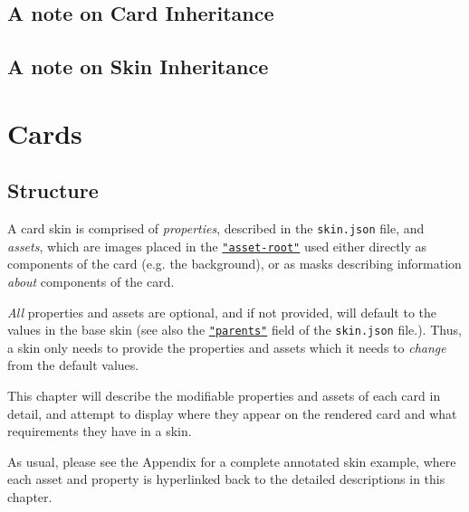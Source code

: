 \documentclass[a4paper, 10pt]{report}
\begin{document}
\section{A note on Card Inheritance}
\section{A note on Skin Inheritance}
\chapter{Cards}\label{chapter:cards}
\section{Structure}
A card skin is comprised of \emph{properties}, described in the \texttt{skin.json} file,
and \emph{assets}, which are images placed in the \hyperlink{skin-asset-root}{\texttt{"asset-root"}}
used either directly as components of the card (e.g. the background),
or as masks describing information \emph{about} components of the card.

\emph{All} properties and assets are optional, and if not provided, will default to the values in the base skin
(see also the \hyperlink{skin-parents}{\texttt{"parents"}} field of the \texttt{skin.json} file.).
Thus, a skin only needs to provide the properties and assets which it needs to \emph{change} from the default values.

This chapter will describe the modifiable properties and assets of each card in detail,
and attempt to display where they appear on the rendered card and what requirements they have in a skin.

As usual, please see the Appendix for a complete annotated skin example,
where each asset and property is hyperlinked back to the detailed descriptions in this chapter.
\end{document}
